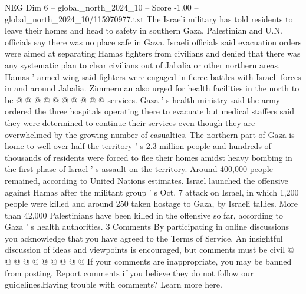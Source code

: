 \begin{textsample}{NEG Dim 6 – global\_north\_2024\_10 – Score -1.00 – global\_north\_2024\_10/115970977.txt}
The Israeli military has told residents to leave their homes and head to safety in southern Gaza.
Palestinian and U.N. officials say there was no place safe in Gaza.
Israeli officials said evacuation orders were aimed at separating Hamas fighters from civilians and denied that there was any systematic plan to clear civilians out of Jabalia or other northern areas.
Hamas ' armed wing said fighters were engaged in fierce battles with Israeli forces in and around Jabalia.
Zimmerman also urged for health facilities in the north to be @ @ @ @ @ @ @ @ @ @ services.
Gaza ' s health ministry said the army ordered the three hospitals operating there to evacuate but medical staffers said they were determined to continue their services even though they are overwhelmed by the growing number of casualties.
The northern part of Gaza is home to well over half the territory ' s 2.3 million people and hundreds of thousands of residents were forced to flee their homes amidst heavy bombing in the first phase of Israel ' s assault on the territory.
Around 400,000 people remained, according to United Nations estimates.
Israel launched the offensive against Hamas after the militant group ' s Oct. 7 attack on Israel, in which 1,200 people were killed and around 250 taken hostage to Gaza, by Israeli tallies.
More than 42,000 Palestinians have been killed in the offensive so far, according to Gaza ' s health authorities. 3 Comments By participating in online discussions you acknowledge that you have agreed to the Terms of Service.
An insightful discussion of ideas and viewpoints is encouraged, but comments must be civil @ @ @ @ @ @ @ @ @ @ If your comments are inappropriate, you may be banned from posting.
Report comments if you believe they do not follow our guidelines.Having trouble with comments?
Learn more here.

\end{textsample}
